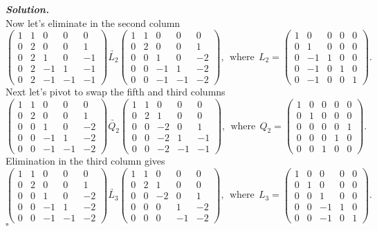 \documentclass[12pt]{report}
\newenvironment{solution}[1][\it{Solution}]{\textbf{#1. } }{$\square$}
\begin{document}
\begin{solution}
\[    \]
    Now let's eliminate in the second column
    \[
        \begin{pmatrix}1&1&0&0&0\\ 0&2&0&0&1\\ 0&2&1&0&-1\\ 0&2&-1&1&-1\\ 0&2&-1&-1&-1\end{pmatrix} \underrightarrow{L_2} \begin{pmatrix}1&1&0&0&0\\ 0&2&0&0&1\\ 0&0&1&0&-2\\ 0&0&-1&1&-2\\ 0&0&-1&-1&-2\end{pmatrix}, ~~ \text{where}~~ L_2 = \begin{pmatrix}1&0&0&0&0\\ 0&1&0&0&0\\ 0&-1&1&0&0\\ 0&-1&0&1&0\\ 0&-1&0&0&1\end{pmatrix}.
    \]
    Next let's pivot to swap the fifth and third columns
    \[ 
        \begin{pmatrix}1&1&0&0&0\\ 0&2&0&0&1\\ 0&0&1&0&-2\\ 0&0&-1&1&-2\\ 0&0&-1&-1&-2\end{pmatrix} \underrightarrow{Q_2} \begin{pmatrix}1&1&0&0&0\\ 0&2&1&0&0\\ 0&0&-2&0&1\\ 0&0&-2&1&-1\\ 0&0&-2&-1&-1\end{pmatrix}, ~~ \text{where}~~ Q_2 = \begin{pmatrix}1&0&0&0&0\\ 0&1&0&0&0\\ 0&0&0&0&1\\ 0&0&0&1&0\\ 0&0&1&0&0\end{pmatrix}.
    \]
    Elimination in the third column gives
    \[ 
        \begin{pmatrix}1&1&0&0&0\\ 0&2&0&0&1\\ 0&0&1&0&-2\\ 0&0&-1&1&-2\\ 0&0&-1&-1&-2\end{pmatrix} \underrightarrow{L_3} \begin{pmatrix}1&1&0&0&0\\ 0&2&1&0&0\\ 0&0&-2&0&1\\ 0&0&0&1&-2\\ 0&0&0&-1&-2\end{pmatrix}, ~~ \text{where}~~ L_3 = \begin{pmatrix}1&0&0&0&0\\ 0&1&0&0&0\\ 0&0&1&0&0\\ 0&0&-1&1&0\\ 0&0&-1&0&1\end{pmatrix}.
\]
\end{solution}
\end{document}
